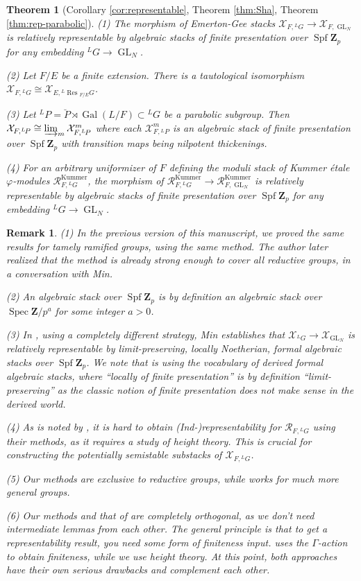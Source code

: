 \documentclass[11pt]{amsart}
\newtheorem{thm}{Theorem}
\newtheorem{remark}{Remark}
\numberwithin{thm}{section}
\numberwithin{lem}{section}
\numberwithin{cor}{section}
\numberwithin{prop}{section}
\numberwithin{exam}{section}
\numberwithin{dfn}{section}
\newcommand{\Gal}{\operatorname{Gal}}
\newcommand{\Res}{\operatorname{Res}}
\newcommand{\GL}{\operatorname{GL}}
\newcommand{\spf}{\operatorname{Spf}}
\newcommand{\spec}{\operatorname{Spec}}
\newcommand{\cX}{\mathcal{X}}
\newcommand{\clR}{\mathcal{R}}
\newcommand{\bP}{\breve{P}}
\newcommand{\Z}{\mathbf{Z}}
\newcommand{\lsup}[2]{{^{#1}\!#2}}
\newcommand{\Kummer}{\operatorname{Kummer}}
\begin{document}
\begin{thm}[Corollary \ref{cor:representable},
Theorem \ref{thm:Sha},
Theorem \ref{thm:rep-parabolic}]
\label{thm:main}
(1)
The morphism of Emerton-Gee stacks
$\cX_{F, \lsup LG}\to\cX_{F,\GL_N}$
is relatively representable
by algebraic stacks of finite presentation over $\spf\Z_p$
for any embedding $\lsup LG\to\GL_N$.

(2)
Let $F/E$ be a finite extension.
There is a tautological isomorphism
$\cX_{F, \lsup LG}\cong\cX_{E, \lsup L\Res_{F/E}G}$.

(3)
Let $\lsup LP=\bP\rtimes \Gal(L/F)\subset\lsup LG$
be a parabolic subgroup.
Then
$\cX_{F, \lsup LP}\cong \varinjlim_m
\cX_{F, \lsup LP}^{m}$
where each
$\cX_{F, \lsup LP}^{m}$
is an algebraic stack of finite presentation
over $\spf\Z_p$
with transition maps being nilpotent thickenings.


(4)
For an arbitrary uniformizer of $F$
defining
the moduli stack
of Kummer \'etale $\varphi$-modules
$\clR_{F,\lsup LG}^{\Kummer}$,
the morphism of
$\clR_{F,\lsup LG}^{\Kummer}\to\clR_{F,\GL_N}^{\Kummer}$
is relatively representable
by algebraic stacks of finite presentation over $\spf\Z_p$
for any embedding $\lsup LG\to\GL_N$.
\end{thm}

\begin{remark}
(1)
In the previous version of this manuscript,
we proved the same results 
for tamely ramified groups,
using the same method.
The author later realized that the method
is already strong enough to cover
all reductive groups,
in a conversation with Min.

(2)
An algebraic stack over $\spf \Z_p$
is by definition an algebraic stack
over $\spec \Z/p^a$
for some integer $a>0$.

(3)
In \cite{Min25},
using a completely different strategy,
Min establishes
that
$\cX_{\lsup LG}\to\cX_{\GL_N}$
is relatively representable
by limit-preserving,
locally Noetherian,
formal algebraic stacks over $\spf\Z_p$.
We note that
\cite{Min25} is using the vocabulary of derived
formal algebraic stacks,
where
``locally of finite presentation''
is by definition
``limit-preserving''
as the classic notion of finite presentation
does not make sense in the derived world.

(4)
As is noted by \cite{Min25},
it is hard to obtain (Ind-)representability
for $\clR_{F,\lsup LG}$
using their methods,
as it requires a study of height theory.
This is crucial for constructing the 
potentially semistable substacks of $\cX_{F, \lsup LG}$.

(5)
Our methods are exclusive to reductive groups,
while \cite{Min25} works for much more general groups.

(6)
Our methods and that of \cite{Min25}
are completely orthogonal,
as we don't need intermediate lemmas from each other.
The general principle is that
to get a representability result,
you need some form of finiteness input.
\cite{Min25} uses the $\Gamma$-action to obtain finiteness,
while we use height theory.
At this point, both approaches
have their own serious drawbacks
and complement each other.
\end{remark}
\end{document}
